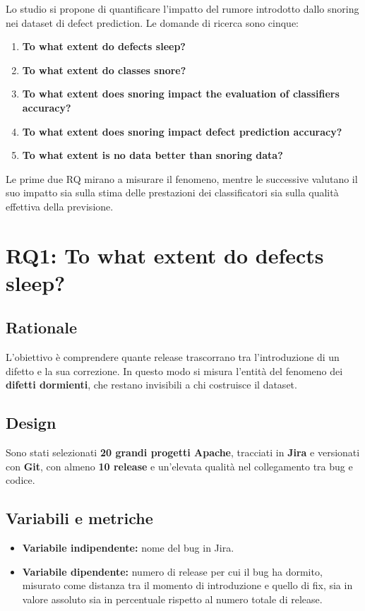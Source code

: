 Lo studio si propone di quantificare l'impatto del rumore introdotto dallo snoring nei dataset di defect prediction. Le domande di ricerca sono cinque:

\begin{enumerate}
    \item \textbf{To what extent do defects sleep?}
    \item \textbf{To what extent do classes snore?}
    \item \textbf{To what extent does snoring impact the evaluation of classifiers accuracy?}
    \item \textbf{To what extent does snoring impact defect prediction accuracy?}
    \item \textbf{To what extent is no data better than snoring data?}
\end{enumerate}

Le prime due RQ mirano a misurare il fenomeno, mentre le successive valutano il suo impatto sia sulla stima delle prestazioni dei classificatori sia sulla qualità effettiva della previsione.

\section{RQ1: To what extent do defects sleep?}

\subsection{Rationale}

L'obiettivo è comprendere quante release trascorrano tra l'introduzione di un difetto e la sua correzione. In questo modo si misura l'entità del fenomeno dei \textbf{difetti dormienti}, che restano invisibili a chi costruisce il dataset.

\subsection{Design}

Sono stati selezionati \textbf{20 grandi progetti Apache}, tracciati in \textbf{Jira} e versionati con \textbf{Git}, con almeno \textbf{10 release} e un'elevata qualità nel collegamento tra bug e codice.

\subsection{Variabili e metriche}

\begin{itemize}
    \item \textbf{Variabile indipendente:} nome del bug in Jira.
    \item \textbf{Variabile dipendente:} numero di release per cui il bug ha dormito, misurato come distanza tra il momento di introduzione e quello di fix, sia in valore assoluto sia in percentuale rispetto al numero totale di release.
\end{itemize}

